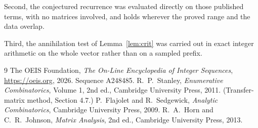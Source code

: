\documentclass[11pt,a4paper]{article}
\theoremstyle{plain}
\theoremstyle{definition}
\begin{document}
Second, the conjectured recurrence was evaluated directly on those published terms, with no
matrices involved, and holds wherever the proved range and the data overlap.

Third, the annihilation test of Lemma~\ref{lem:crit} was carried out in exact integer
arithmetic on the whole vector rather than on a sampled prefix.

\begin{thebibliography}{9}
 The OEIS Foundation, \emph{The On-Line Encyclopedia of Integer
Sequences}, \url{https://oeis.org}, 2026. Sequence A248485.
 R.~P.~Stanley, \emph{Enumerative Combinatorics}, Volume 1, 2nd ed.,
Cambridge University Press, 2011. (Transfer-matrix method, Section 4.7.)
 P.~Flajolet and R.~Sedgewick, \emph{Analytic Combinatorics}, Cambridge
University Press, 2009.
 R.~A.~Horn and C.~R.~Johnson, \emph{Matrix Analysis}, 2nd ed., Cambridge
University Press, 2013.
\end{thebibliography}
\end{document}
